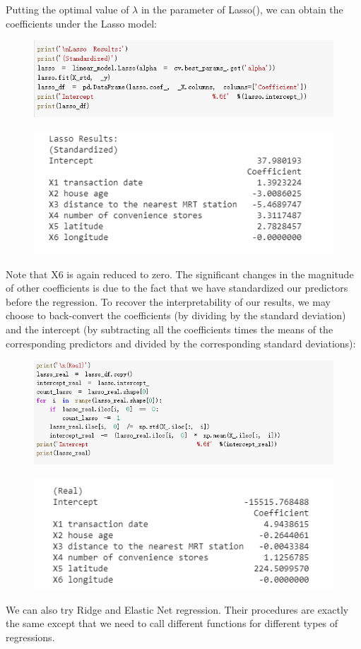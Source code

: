 \documentclass{article}
\begin{document}
Putting the optimal value of $\lambda$ in the parameter of Lasso(), we can obtain the coefficients under the Lasso model:
\begin{figure}[H]\includegraphics[width=\linewidth]{40}\end{figure}
\begin{figure}[H]\includegraphics[width=0.75\linewidth]{41}\end{figure}
Note that X6 is again reduced to zero. The significant changes in the magnitude of other coefficients is due to the fact that we have standardized our predictors before the regression. To recover the interpretability of our results, we may choose to back-convert the coefficients (by dividing by the standard deviation) and the intercept (by subtracting all the coefficients times the means of the corresponding predictors and divided by the corresponding standard deviations):
\begin{figure}[H]\includegraphics[width=\linewidth]{42}\end{figure}
\begin{figure}[H]\includegraphics[width=0.75\linewidth]{43}\end{figure}
We can also try Ridge and Elastic Net regression. Their procedures are exactly the same except that we need to call different functions for different types of regressions.
\end{document}
